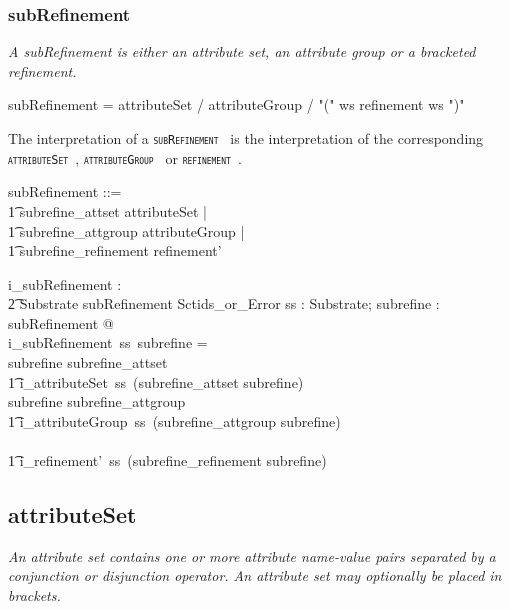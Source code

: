 \documentclass{article}
\def\spec#1{{\tt \small \textsc{{#1}} }}
\def\bnf#1{{\scriptsize {{#1}} }}
\def\desc#1{{\small \textsl{{#1}} }}
\begin{document}
\subsubsection{subRefinement}
\begin{framed}
\desc{ A subRefinement is either an attribute set, an attribute group or a bracketed refinement.}
\end{framed}

\begin{framed}
\noindent
\bnf{subRefinement = attributeSet / attributeGroup / "(" ws refinement ws ")"}
\end{framed}

The interpretation of a \spec{subRefinement} is the interpretation of the corresponding \spec{attributeSet}, \spec{attributeGroup} or \spec{refinement}.

\begin{zed}
subRefinement ::= \\
\t1 subrefine\_attset \ldata attributeSet \rdata | \\
\t1 subrefine\_attgroup \ldata attributeGroup \rdata | \\
\t1 subrefine\_refinement \ldata refinement' \rdata
\end{zed}


\begin{gendef}
   i\_subRefinement : \\
\t2 Substrate \fun subRefinement \fun Sctids\_or\_Error
\where
   \forall ss : Substrate; subrefine : subRefinement @ \\
   i\_subRefinement~ss~subrefine = \\
   \IF subrefine \in \ran subrefine\_attset \THEN\\
   \t1  i\_attributeSet~ss~(subrefine\_attset \inv subrefine) \\
   \ELSE \IF subrefine \in \ran subrefine\_attgroup \THEN \\
   \t1 i\_attributeGroup~ss~(subrefine\_attgroup \inv subrefine) \\
  \ELSE \\
  \t1 i\_refinement'~ss~(subrefine\_refinement \inv subrefine)
\end{gendef}

\subsection{attributeSet}
\begin{framed}
\desc{An attribute set contains one or more attribute name-value pairs separated by a conjunction or disjunction operator. An attribute set may optionally be placed in brackets.}
\end{framed}
\end{document}
